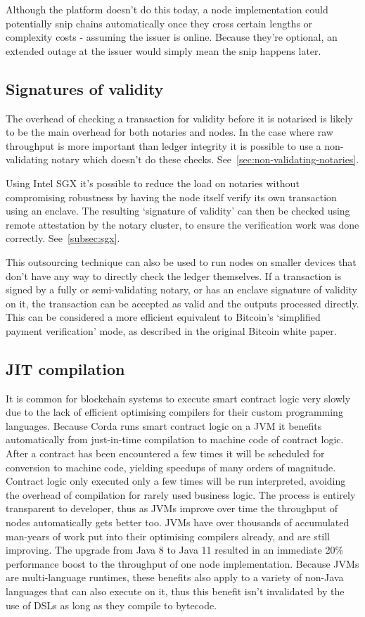 \documentclass{article}
\begin{document}
Although the platform doesn't do this today, a node implementation could potentially snip chains automatically once
they cross certain lengths or complexity costs - assuming the issuer is online. Because they're optional, an extended
outage at the issuer would simply mean the snip happens later.

\subsection{Signatures of validity}

The overhead of checking a transaction for validity before it is notarised is likely to be the main overhead for
both notaries and nodes. In the case where raw throughput is more important than ledger integrity it is possible to use a
non-validating notary which doesn't do these checks. See~\cref{sec:non-validating-notaries}.

Using Intel SGX it's possible to reduce the load on notaries without compromising robustness by having the node itself
verify its own transaction using an enclave. The resulting `signature of validity' can then be checked using remote
attestation by the notary cluster, to ensure the verification work was done correctly. See~\cref{subsec:sgx}.

This outsourcing technique can also be used to run nodes on smaller devices that don't have any way to directly check
the ledger themselves. If a transaction is signed by a fully or semi-validating notary, or has an enclave signature of
validity on it, the transaction can be accepted as valid and the outputs processed directly. This can be considered
a more efficient equivalent to Bitcoin's `simplified payment verification' mode, as described in the original Bitcoin
white paper.

\subsection{JIT compilation}

It is common for blockchain systems to execute smart contract logic very slowly due to the lack of efficient
optimising compilers for their custom programming languages. Because Corda runs smart contract logic on a JVM it
benefits automatically from just-in-time compilation to machine code of contract logic. After a contract has been
encountered a few times it will be scheduled for conversion to machine code, yielding speedups of many orders of
magnitude. Contract logic only executed only a few times will be run interpreted, avoiding the overhead of
compilation for rarely used business logic. The process is entirely transparent to developer, thus as JVMs improve
over time the throughput of nodes automatically gets better too. JVMs have over thousands of accumulated man-years
of work put into their optimising compilers already, and are still improving. The upgrade from Java 8 to Java 11
resulted in an immediate 20\% performance boost to the throughput of one node implementation. Because JVMs are
multi-language runtimes, these benefits also apply to a variety of non-Java languages that can also execute on it,
thus this benefit isn't invalidated by the use of DSLs as long as they compile to bytecode.
\end{document}
